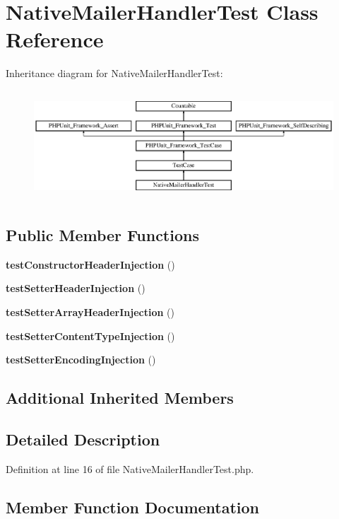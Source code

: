 \section{Native\+Mailer\+Handler\+Test Class Reference}
\label{class_monolog_1_1_handler_1_1_native_mailer_handler_test}
Inheritance diagram for Native\+Mailer\+Handler\+Test\+:\begin{figure}[H]
\begin{center}
\leavevmode
\includegraphics[height=4.129793cm]{class_monolog_1_1_handler_1_1_native_mailer_handler_test}
\end{center}
\end{figure}
\subsection*{Public Member Functions}
\begin{DoxyCompactItemize}
\item 
{\bf test\+Constructor\+Header\+Injection} ()
\item 
{\bf test\+Setter\+Header\+Injection} ()
\item 
{\bf test\+Setter\+Array\+Header\+Injection} ()
\item 
{\bf test\+Setter\+Content\+Type\+Injection} ()
\item 
{\bf test\+Setter\+Encoding\+Injection} ()
\end{DoxyCompactItemize}
\subsection*{Additional Inherited Members}


\subsection{Detailed Description}


Definition at line 16 of file Native\+Mailer\+Handler\+Test.\+php.



\subsection{Member Function Documentation}
